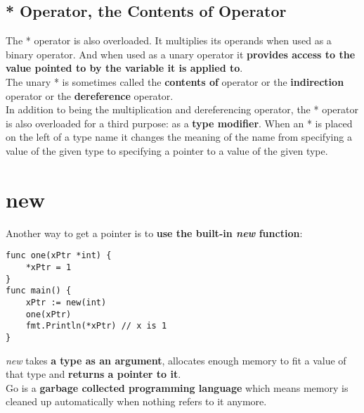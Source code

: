 \documentclass[10pt,letterpaper]{report}
\begin{document}
\subsection{* Operator, the Contents of Operator}
The * operator is also overloaded. It multiplies its operands when used as a binary operator. And when used as a unary operator it \textbf{provides access to the value pointed to by the variable it is applied to}.\\
The unary * is sometimes called the \textbf{contents of} operator or the \textbf{indirection} operator or the \textbf{dereference} operator.\\
In addition to being the multiplication and dereferencing operator, the * operator is also overloaded for a third purpose: as a \textbf{type modifier}. When an * is placed on the left of a type name it changes the meaning of the name from specifying a value of the given type to specifying a pointer to a value of the given type.
\section{new}
Another way to get a pointer is to \textbf{use the built-in \textit{new} function}:
\begin{lstlisting}
func one(xPtr *int) {
	*xPtr = 1
}
func main() {
	xPtr := new(int)
	one(xPtr)
	fmt.Println(*xPtr) // x is 1
}
\end{lstlisting}
\textit{new} takes \textbf{a type as an argument}, allocates enough memory to fit a value of that type and \textbf{returns a pointer to it}.\\
Go is a \textbf{garbage collected programming language} which means memory is cleaned up automatically when nothing refers to it anymore.
\end{document}
